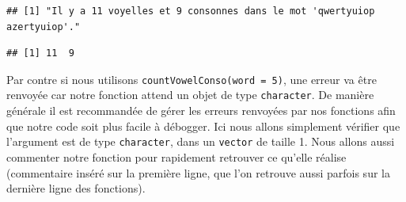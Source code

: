 \documentclass[]{book}
\newenvironment{Shaded}{\begin{snugshade}}{\end{snugshade}}
\newcommand{\ControlFlowTok}[1]{\textcolor[rgb]{0.13,0.29,0.53}{\textbf{#1}}}
\newcommand{\DataTypeTok}[1]{\textcolor[rgb]{0.13,0.29,0.53}{#1}}
\newcommand{\DecValTok}[1]{\textcolor[rgb]{0.00,0.00,0.81}{#1}}
\newcommand{\KeywordTok}[1]{\textcolor[rgb]{0.13,0.29,0.53}{\textbf{#1}}}
\newcommand{\NormalTok}[1]{#1}
\newcommand{\OperatorTok}[1]{\textcolor[rgb]{0.81,0.36,0.00}{\textbf{#1}}}
\newcommand{\StringTok}[1]{\textcolor[rgb]{0.31,0.60,0.02}{#1}}
\begin{document}
\begin{Shaded}
\end{Shaded}

\begin{verbatim}
## [1] "Il y a 11 voyelles et 9 consonnes dans le mot 'qwertyuiop azertyuiop'."
\end{verbatim}

\begin{verbatim}
## [1] 11  9
\end{verbatim}

Par contre si nous utilisons \texttt{countVowelConso(word\ =\ 5)}, une erreur va être renvoyée car notre fonction attend un objet de type \texttt{character}. De manière générale il est recommandée de gérer les erreurs renvoyées par nos fonctions afin que notre code soit plus facile à débogger. Ici nous allons simplement vérifier que l'argument est de type \texttt{character}, dans un \texttt{vector} de taille 1. Nous allons aussi commenter notre fonction pour rapidement retrouver ce qu'elle réalise (commentaire inséré sur la première ligne, que l'on retrouve aussi parfois sur la dernière ligne des fonctions).
\end{document}
